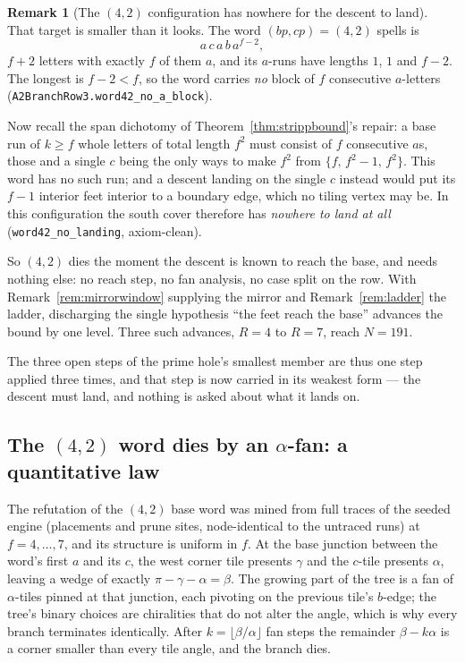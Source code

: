 \documentclass[11pt,reqno]{amsart}
\theoremstyle{plain}
\theoremstyle{definition}
\newtheorem{remark}[theorem]{Remark}
\begin{document}
\begin{remark}[The $(4,2)$ configuration has nowhere for the descent to land]\label{rem:word42}
That target is smaller than it looks. The word $(bp,cp)=(4,2)$ spells is
\[
  a\,c\,a\,b\,a^{f-2},
\]
$f+2$ letters with exactly $f$ of them $a$, and its $a$-runs have lengths $1$, $1$ and $f-2$. The
longest is $f-2<f$, so the word carries \emph{no} block of $f$ consecutive $a$-letters
(\texttt{A2BranchRow3.word42\_no\_a\_block}).

Now recall the span dichotomy of Theorem~\ref{thm:strippbound}'s repair: a base run of $k\ge f$
whole letters of total length $f^2$ must consist of $f$ consecutive $a$s, those and a single $c$
being the only ways to make $f^2$ from $\{f,\,f^2-1,\,f^2\}$. This word has no such run; and a
descent landing on the single $c$ instead would put its $f-1$ interior feet interior to a boundary
edge, which no tiling vertex may be. In this configuration the south cover therefore has
\emph{nowhere to land at all} (\texttt{word42\_no\_landing}, axiom-clean).

So $(4,2)$ dies the moment the descent is known to reach the base, and needs nothing else: no reach
step, no fan analysis, no case split on the row. With Remark~\ref{rem:mirrorwindow} supplying the
mirror and Remark~\ref{rem:ladder} the ladder, discharging the single hypothesis ``the feet reach
the base'' advances the bound by one level. Three such advances, $R=4$ to $R=7$, reach $N=191$.

The three open steps of the prime hole's smallest member are thus one step applied three times, and
that step is now carried in its weakest form --- the descent must land, and nothing is asked about
what it lands on.
\end{remark}

\subsection{The $(4,2)$ word dies by an $\alpha$-fan: a quantitative law}\label{sub:fanlaw}

The refutation of the $(4,2)$ base word was mined from full traces of the seeded engine
(placements and prune sites, node-identical to the untraced runs) at $f=4,\dots,7$, and its
structure is uniform in $f$. At the base junction between the word's first $a$ and its $c$, the
west corner tile presents $\gamma$ and the $c$-tile presents $\alpha$, leaving a wedge of exactly
$\pi-\gamma-\alpha=\beta$. The growing part of the tree is a fan of $\alpha$-tiles pinned at that
junction, each pivoting on the previous tile's $b$-edge; the tree's binary choices are chiralities
that do not alter the angle, which is why every branch terminates identically. After
$k=\lfloor\beta/\alpha\rfloor$ fan steps the remainder $\beta-k\alpha$ is a corner smaller than
every tile angle, and the branch dies.
\end{document}
